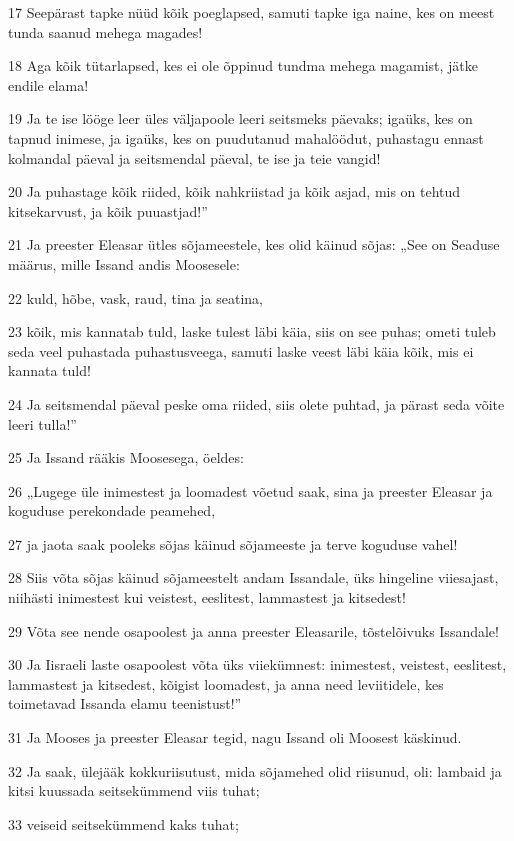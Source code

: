 \par 17 Seepärast tapke nüüd kõik poeglapsed, samuti tapke iga naine, kes on meest tunda saanud mehega magades!
\par 18 Aga kõik tütarlapsed, kes ei ole õppinud tundma mehega magamist, jätke endile elama!
\par 19 Ja te ise lööge leer üles väljapoole leeri seitsmeks päevaks; igaüks, kes on tapnud inimese, ja igaüks, kes on puudutanud mahalöödut, puhastagu ennast kolmandal päeval ja seitsmendal päeval, te ise ja teie vangid!
\par 20 Ja puhastage kõik riided, kõik nahkriistad ja kõik asjad, mis on tehtud kitsekarvust, ja kõik puuastjad!”
\par 21 Ja preester Eleasar ütles sõjameestele, kes olid käinud sõjas: „See on Seaduse määrus, mille Issand andis Moosesele:
\par 22 kuld, hõbe, vask, raud, tina ja seatina,
\par 23 kõik, mis kannatab tuld, laske tulest läbi käia, siis on see puhas; ometi tuleb seda veel puhastada puhastusveega, samuti laske veest läbi käia kõik, mis ei kannata tuld!
\par 24 Ja seitsmendal päeval peske oma riided, siis olete puhtad, ja pärast seda võite leeri tulla!”
\par 25 Ja Issand rääkis Moosesega, öeldes:
\par 26 „Lugege üle inimestest ja loomadest võetud saak, sina ja preester Eleasar ja koguduse perekondade peamehed,
\par 27 ja jaota saak pooleks sõjas käinud sõjameeste ja terve koguduse vahel!
\par 28 Siis võta sõjas käinud sõjameestelt andam Issandale, üks hingeline viiesajast, niihästi inimestest kui veistest, eeslitest, lammastest ja kitsedest!
\par 29 Võta see nende osapoolest ja anna preester Eleasarile, tõstelõivuks Issandale!
\par 30 Ja Iisraeli laste osapoolest võta üks viiekümnest: inimestest, veistest, eeslitest, lammastest ja kitsedest, kõigist loomadest, ja anna need leviitidele, kes toimetavad Issanda elamu teenistust!”
\par 31 Ja Mooses ja preester Eleasar tegid, nagu Issand oli Moosest käskinud.
\par 32 Ja saak, ülejääk kokkuriisutust, mida sõjamehed olid riisunud, oli: lambaid ja kitsi kuussada seitsekümmend viis tuhat;
\par 33 veiseid seitsekümmend kaks tuhat;
